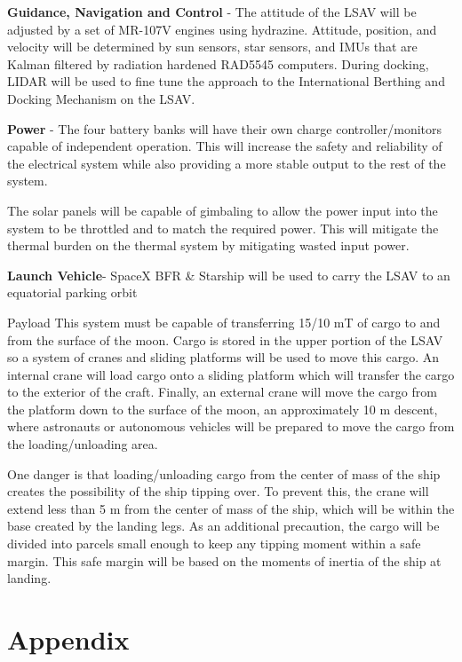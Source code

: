 \documentclass[10pt]{article}
\begin{document}
\textbf{Guidance, Navigation and Control} - The attitude of the LSAV
will be adjusted by a set of MR-107V engines using
hydrazine. Attitude, position, and velocity will be determined by sun
sensors, star sensors, and IMUs that are Kalman filtered by radiation
hardened RAD5545 computers. During docking, LIDAR will be used to fine
tune the approach to the International Berthing and Docking Mechanism
on the LSAV.

\textbf{Power} - The four battery banks will have their own charge
controller/monitors capable of independent operation. This will
increase the safety and reliability of the electrical system while
also providing a more stable output to the rest of the system.


The solar panels will be capable of gimbaling to allow the power input
into the system to be throttled and to match the required power. This
will mitigate the thermal burden on the thermal system by mitigating
wasted input power.

\textbf{Launch Vehicle}- SpaceX BFR \& Starship will be used to carry the LSAV
to an equatorial parking orbit

Payload This system must be capable of transferring 15/10 mT of cargo
to and from the surface of the moon. Cargo is stored in the upper
portion of the LSAV so a system of cranes and sliding platforms will
be used to move this cargo. An internal crane will load cargo onto a
sliding platform which will transfer the cargo to the exterior of the
craft. Finally, an external crane will move the cargo from the
platform down to the surface of the moon, an approximately 10 m
descent, where astronauts or autonomous vehicles will be prepared to
move the cargo from the loading/unloading area.

One danger is that loading/unloading cargo from the center of mass of
the ship creates the possibility of the ship tipping over. To prevent
this, the crane will extend less than 5 m from the center of mass of
the ship, which will be within the base created by the landing
legs. As an additional precaution, the cargo will be divided into
parcels small enough to keep any tipping moment within a safe
margin. This safe margin will be based on the moments of inertia of
the ship at landing.


\newpage
\section{Appendix}
\end{document}
